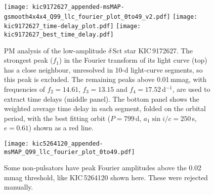 \documentclass[a4paper,fleqn,usenatbib]{mnras}
\begin{document}
\begin{figure}
\begin{center}
\texttt{[image: kic9172627\_appended-msMAP-gsmooth4x4x4\_Q99\_llc\_fourier\_plot\_0to49\_v2.pdf]}
\texttt{[image: kic9172627\_time-delay\_plot.pdf]}
\texttt{[image: kic9172627\_best\_time\_delay.pdf]}
\caption{PM analysis of the low-amplitude $\delta$\,Sct star KIC\,9172627. The strongest peak ($f_1$) in the Fourier transform of its light curve (top) has a close neighbour, unresolved in 10-d light-curve segments, so this peak is excluded. The remaining peaks above 0.01\,mmag, with frequencies of \mbox{$f_2=14.61$}, \mbox{$f_3=13.15$} and \mbox{$f_4=17.52$}\,d$^{-1}$, are used to extract time delays (middle panel). The bottom panel shows the weighted average time delay in each segment, folded on the orbital period, with the best fitting orbit ($P = 799$\,d, $a_1 \sin i / c = 250$\,s, $e=0.61$) shown as a red line.}
\label{fig:low-amp}
\end{center}
\end{figure}


\begin{figure}
\begin{center}
\texttt{[image: kic5264120\_appended-msMAP\_Q99\_llc\_fourier\_plot\_0to49.pdf]}
\caption{Some non-pulsators have peak Fourier amplitudes above the 0.02\,mmag threshold, like KIC\,5264120 shown here. These were rejected manually.}
\label{fig:non-puls}
\end{center}
\end{figure}
\end{document}

